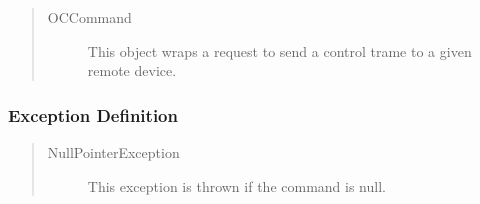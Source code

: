 \begin{quote}
	\begin{description}
		\item[OCCommand] This object wraps a request to send a control
		trame to a given remote device.
	\end{description} 
\end{quote}

\subsubsection{Exception Definition}

\begin{quote}
	\begin{description}
		\item[NullPointerException] This exception is thrown if the command is null.
	\end{description} 
\end{quote}